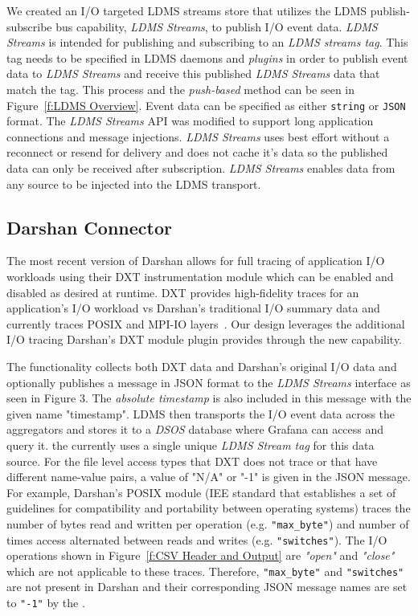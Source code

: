 We created an I/O targeted LDMS streams store that utilizes the LDMS publish-subscribe 
bus capability, \emph{LDMS Streams}, to publish I/O event data. \emph{LDMS Streams} 
is intended for publishing and subscribing to an \emph{LDMS streams tag}. 
This tag needs to be specified in LDMS daemons and \emph{plugins} in order to publish event data to \emph{LDMS Streams} and receive this published \emph{LDMS Streams} data that match the tag. This process and the \emph{push-based} method can be seen in Figure~\ref{f:LDMS Overview}. Event data can be specified as either \texttt{string} or \texttt{JSON} format. The \emph{LDMS Streams} API was modified to support long application connections and message injections. \emph{LDMS Streams} uses best effort without a reconnect or resend for delivery and does not cache it's data so the published data can only be received after subscription. \emph{LDMS Streams} enables data
from any source to be injected into the LDMS transport.

\subsection{Darshan Connector}

The most recent version of Darshan allows for full tracing of application I/O workloads using their DXT instrumentation module which can be enabled and disabled as desired at runtime. DXT provides high-fidelity traces for an application's I/O workload vs Darshan's traditional I/O summary data and currently traces POSIX and MPI-IO layers~\cite{darshan-runtime}. Our design leverages the additional I/O tracing Darshan's DXT module plugin provides through the new \connector{} capability.


The \connector{} functionality collects both DXT data and Darshan's original I/O 
data and optionally publishes a message in JSON format to the \emph{LDMS Streams} 
interface as seen in Figure 3. The \emph{absolute timestamp} is also included in 
this message with the given name "timestamp". LDMS then transports the I/O event 
data across the aggregators and stores it to a \emph{DSOS} database where Grafana 
can access and query it. the \connector{} currently uses a single unique 
\emph{LDMS Stream tag} for this data source. For the file level access types 
that DXT does not trace or that have different name-value pairs, a value of "N/A" 
or "-1" is given in the JSON message. For example, Darshan's POSIX module (IEE 
standard that establishes a set of guidelines for compatibility and portability 
between operating systems) traces the number of bytes read and written per 
operation (e.g. \texttt{"max\_byte"}) and number of times access alternated between 
reads and writes (e.g. \texttt{"switches"}). The I/O operations shown in 
Figure~\ref{f:CSV Header and Output} are \emph{"open"} and \emph{"close"} which 
are not applicable to these traces. Therefore, \texttt{"max\_byte"} 
and \texttt{"switches"} are not present in Darshan and their corresponding JSON 
message names are set to \texttt{"-1"} by the \connector{}.    

